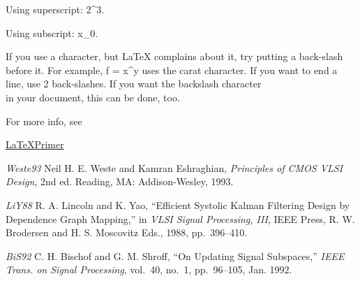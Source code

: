 \documentclass{article}
\begin{document}
Using superscript: 2^3.

Using subscript: x_0.

If you use a character, but LaTeX complains about it, try putting a
back-slash before it. For example,
f = x^y uses the carat character.
If you want to end a line, use 2 back-slashes.
If you want the backslash character \\ in your document,
this can be done, too.

For more info, see


\href{https://www.maths.tcd.ie/~7ddwilkins/LaTeXPrimer}{LaTeXPrimer}



\begin{thebibliography}{99}

\emph{Weste93} Neil H. E. Weste and Kamran Eshraghian, \textit{Principles
of CMOS VLSI Design}, 2nd ed. Reading, MA: Addison-Wesley, 1993.

\emph{LiY88} R. A. Lincoln and K. Yao, ``Efficient Systolic Kalman
Filtering Design by Dependence Graph Mapping,'' in \textit{VLSI Signal
Processing, III}, IEEE Press, R. W. Brodersen and H. S. Moscovitz Eds.,
1988, pp.~396--410.

\emph{BiS92} C. H. Bischof and G. M. Shroff, ``On Updating Signal
Subspaces,'' \textit{IEEE Trans. on Signal Processing}, vol.~40, no.~1,
pp.~96--105, Jan. 1992.

\end{thebibliography}
\end{document}
